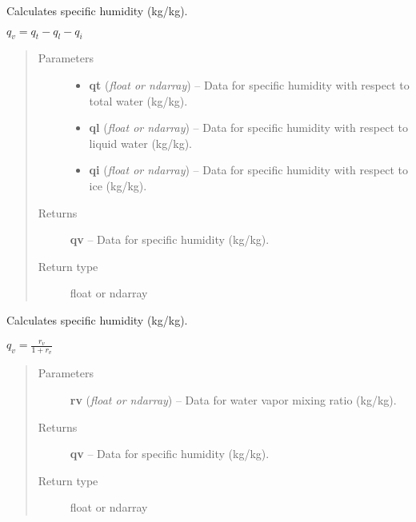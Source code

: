 \documentclass[letterpaper,10pt,english]{sphinxmanual}
\begin{document}
\begin{fulllineitems}
\label{atmos:atmos.equations.qv_from_qt_ql_qi}
Calculates specific humidity (kg/kg).

\(q_v = q_t-q_l-q_i\)
\begin{quote}\begin{description}
\item[{Parameters}] \leavevmode\begin{itemize}
\item {} 
\textbf{qt} (\emph{float or ndarray}) -- Data for specific humidity with respect to total water (kg/kg).

\item {} 
\textbf{ql} (\emph{float or ndarray}) -- Data for specific humidity with respect to liquid water (kg/kg).

\item {} 
\textbf{qi} (\emph{float or ndarray}) -- Data for specific humidity with respect to ice (kg/kg).

\end{itemize}

\item[{Returns}] \leavevmode
\textbf{qv} --
Data for specific humidity (kg/kg).

\item[{Return type}] \leavevmode
float or ndarray

\end{description}\end{quote}

\end{fulllineitems}


\begin{fulllineitems}
\label{atmos:atmos.equations.qv_from_rv}
Calculates specific humidity (kg/kg).

\(q_v = \frac{r_v}{1+r_v}\)
\begin{quote}\begin{description}
\item[{Parameters}] \leavevmode
\textbf{rv} (\emph{float or ndarray}) -- Data for water vapor mixing ratio (kg/kg).

\item[{Returns}] \leavevmode
\textbf{qv} --
Data for specific humidity (kg/kg).

\item[{Return type}] \leavevmode
float or ndarray

\end{description}\end{quote}

\end{fulllineitems}
\end{document}
